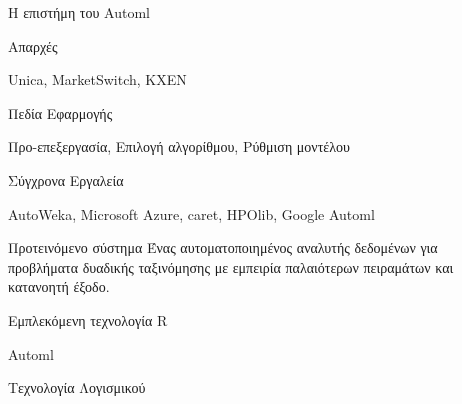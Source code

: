 \documentclass{beamer}
\begin{document}
  \begin{frame}{Η επιστήμη του Automl}
  	\begin{minipage}[t]{.4\textwidth}  		
  		Απαρχές
  		\vspace{4ex}
  	\end{minipage}%
  	  	\begin{minipage}[t]{.5\textwidth}
  	  		Unica, MarketSwitch, KXEN  	
  	  		\vspace{4ex}
  	  	\end{minipage}
  	\begin{minipage}[t]{.4\textwidth}  		
  		Πεδία Εφαρμογής
  		\vspace{4ex}
  	\end{minipage}%
  	\begin{minipage}[t]{.5\textwidth}
  		Προ-επεξεργασία, Επιλογή αλγορίθμου, Ρύθμιση μοντέλου
  		\vspace{4ex} 
  	\end{minipage}
  	\begin{minipage}[t]{.4\textwidth}  		
  		Σύγχρονα Εργαλεία
  		\vspace{4ex}
  	\end{minipage}%
	\begin{minipage}[t]{.5\textwidth}
  		AutoWeka, Microsoft Azure, caret, HPOlib, Google Automl
  		\vspace{4ex}
  	\end{minipage}
  \end{frame}
  
  \begin{frame} {Προτεινόμενο σύστημα}
  	Ένας \alert{αυτοματοποιημένος} αναλυτής δεδομένων για προβλήματα δυαδικής ταξινόμησης με \alert{εμπειρία} παλαιότερων πειραμάτων και \alert{κατανοητή} έξοδο.
  	
  \end{frame}
  
  \begin{frame} {Εμπλεκόμενη τεχνολογία}
  	R
  	
  	Automl
  	
  	Τεχνολογία Λογισμικού
  	
  \end{frame}
\end{document}

